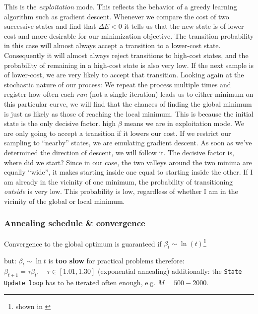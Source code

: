 {\begin{itemize}
This is the \emph{exploitation} mode. This reflects the behavior of a greedy learning algorithm such as gradient descent. Whenever we compare the cost of two successive states and find that $\Delta E < 0$ it tells us that the new state is of lower cost and more desirable for our minimization objective. The transition probability in this case will almost always accept a transition to a lower-cost state. Consequently it will almost always reject transitions to high-cost states, and the probability of remaining in a high-cost state is also very low. If the next sample is of lower-cost, we are very likely to accept that transition. Looking again at the stochastic nature of our process: We repeat the process multiple times and register how often each \emph{run} (not a single iteration) leads us to either minimum on this particular curve, we will find that the chances of finding the global minimum is just as likely as those of reaching the local minimum. This is because the initial state is the only decisive factor. high $\beta$ means we are in exploitation mode. We are only going to accept a transition if it lowers our cost. If we restrict our sampling to ``nearby'' states, we are emulating gradient descent. As soon as we've determined the direction of descent, we will follow it. The decisive factor is, where did we start? Since in our case, the two valleys around the two minima are equally ``wide'', it makes starting inside one equal to starting inside the other. If I am already in the vicinity of one minimum, the probability of transitioning \emph{outside} is very low. This probability is low, regardless of whether I am in the vicinity of the global or local minimum.
\end{itemize}
}

\begin{frame}\frametitle{Annealing schedule \& convergence}
Convergence to the global optimum is guaranteed if $\beta_t \sim \ln (t)$\footnote{shown in \citep{geman1984stochastic}}

\begin{itemize}
	\itR but: $\beta_t \sim \ln t$ is \textbf{too slow} for practical problems
	\itR therefore: $\beta_{t+1} = \tau \beta_t, \quad \tau \in [1.01,1.30]$
		(exponential annealing)
	\itR additionally: the \texttt{State Update loop} has to be iterated often enough, e.g. $M=500-2000$. 
\end{itemize}
\end{frame}


